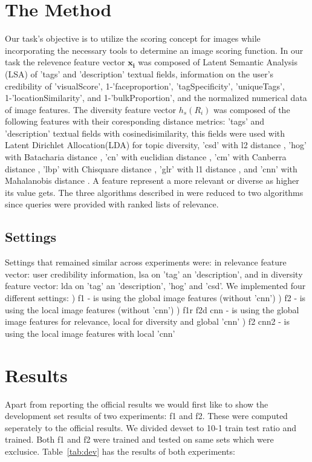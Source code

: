 \documentclass{sig-alternate}
\begin{document}
{\section{The Method}
Our task's objective is to utilize the scoring concept for images while incorporating the necessary tools to determine an image scoring function. In our task 
the relevence feature vector $\mathbf{x_{i}}$ was composed of Latent Semantic Analysis (LSA) \cite{lsa} of 'tags' and 'description' textual fields, 
information on the user's credibility of 'visualScore', 1-'faceproportion', 'tagSpecificity', 'uniqueTags', 1-'locationSimilarity', and 1-'bulkProportion', 
and the normalized numerical data of image features.
The diversity feature vector $h_{s}(R_{i})$ was composed of the following features with their coresponding distance metrics: 
'tags' and 'description' textual fields with cosinedisimilarity, this fields were used with Latent Dirichlet Allocation(LDA) \cite{lda} for topic diversity, 'csd' with l2 distance \cite{csd}, 'hog' with Batacharia distance \cite{hog}, 'cn' with
euclidian distance \cite{cn}, 'cm' with Canberra distance \cite{cm}, 'lbp' with Chisquare distance \cite{glbp}, 'glr' with l1 distance \cite{glr}, 
and 'cnn' with Mahalanobis distance \cite{cnn}. A feature represent a more relevant or diverse as higher its value gets.
The three algorithms described in \cite{fscore} were reduced to two algorithms since queries were provided with ranked lists 
of relevance.


\subsection{Settings}
Settings that remained similar across experiments were:
in relevance feature vector: user credibility information, lsa on 'tag' an 'description', and in diversity feature vector:
lda on 'tag' an 'description', 'hog' and 'csd'.
We implemented four different settings:
) f1 - is using the global image features (without 'cnn')
) f2 - is using the local image features (without 'cnn')
) f1r f2d cnn - is using the global image features for relevance, local for diversity and global 'cnn'
) f2 cnn2 - is using the local image features with local 'cnn'


\section{Results}
Apart from reporting the official results we would first like to show the development set results of 
two experiments: f1 and f2. These were computed seperately to the official results. We divided devset to 10-1 train test ratio
and trained. Both f1 and f2 were trained and tested on same sets which were exclusice. 
Table~\ref{tab:dev} has the results of both experiments:

}
\end{document}
